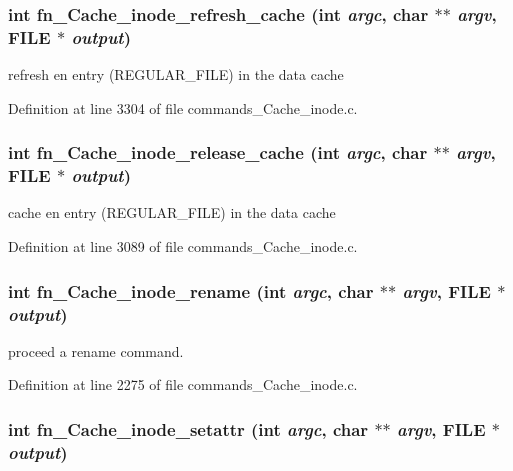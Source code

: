 \subsubsection[{fn\_\-Cache\_\-inode\_\-refresh\_\-cache}]{\setlength{\rightskip}{0pt plus 5cm}int fn\_\-Cache\_\-inode\_\-refresh\_\-cache (int {\em argc}, \/  char $\ast$$\ast$ {\em argv}, \/  FILE $\ast$ {\em output})}\label{commands_8h_006ca27f7fd03ab4245e4a5b28fe4784}


refresh en entry (REGULAR\_\-FILE) in the data cache 

Definition at line 3304 of file commands\_\-Cache\_\-inode.c.
\subsubsection[{fn\_\-Cache\_\-inode\_\-release\_\-cache}]{\setlength{\rightskip}{0pt plus 5cm}int fn\_\-Cache\_\-inode\_\-release\_\-cache (int {\em argc}, \/  char $\ast$$\ast$ {\em argv}, \/  FILE $\ast$ {\em output})}\label{commands_8h_203776f9d299bcef300c35f1be807411}


cache en entry (REGULAR\_\-FILE) in the data cache 

Definition at line 3089 of file commands\_\-Cache\_\-inode.c.
\subsubsection[{fn\_\-Cache\_\-inode\_\-rename}]{\setlength{\rightskip}{0pt plus 5cm}int fn\_\-Cache\_\-inode\_\-rename (int {\em argc}, \/  char $\ast$$\ast$ {\em argv}, \/  FILE $\ast$ {\em output})}\label{commands_8h_616439560ee7cd599d64c3de8b55b36d}


proceed a rename command. 

Definition at line 2275 of file commands\_\-Cache\_\-inode.c.
\subsubsection[{fn\_\-Cache\_\-inode\_\-setattr}]{\setlength{\rightskip}{0pt plus 5cm}int fn\_\-Cache\_\-inode\_\-setattr (int {\em argc}, \/  char $\ast$$\ast$ {\em argv}, \/  FILE $\ast$ {\em output})}\label{commands_8h_9e606e96829ada43c70f227cd6b9cd52}


